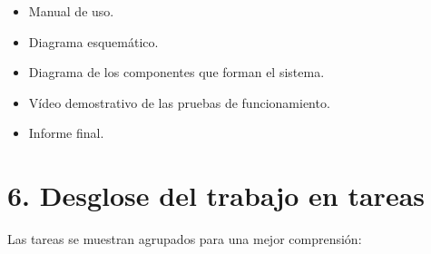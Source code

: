\documentclass[11pt]{charter}
\begin{document}
\begin{itemize}
\item Manual de uso.
\item Diagrama esquemático.
\item Diagrama de los componentes que forman el sistema.
\item Vídeo demostrativo de las pruebas de funcionamiento.
\item Informe final.

\end{itemize}

\section{6. Desglose del trabajo en tareas}
\label{sec:wbs}
Las tareas se muestran agrupados para una mejor comprensión:
\end{document}

